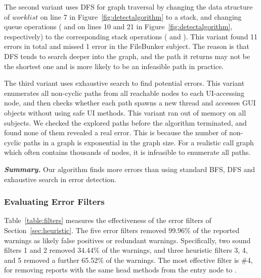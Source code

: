 The second variant uses DFS for graph traversal by changing
the data structure of $\mathit{worklist}$ on line 7 in Figure~\ref{fig:detectalgorithm} to
a stack, and changing queue operations ( and 
on lines 10 and 21 in Figure~\ref{fig:detectalgorithm}, respectively)
to the corresponding stack operations ( and ).
This variant found 11 errors in total and missed 1 error in the FileBunker subject.
The reason is that DFS tends to search deeper into the graph, and the path it returns
may not be the shortest one and is more likely to be an infeasible path in practice.


The third variant uses exhaustive search to find potential errors. This variant
enumerates all non-cyclic paths from all reachable  nodes
to each UI-accessing node, and then checks whether each
path spawns a new thread and accesses GUI objects without using safe UI methods.
This variant ran out of memory on all subjects. We checked
the explored paths before the algorithm terminated, and found none of them
revealed a real error. This is because the number of
non-cyclic paths in a graph is exponential in the graph size.
For a realistic call graph which often contains thousands of nodes,
it is infeasible to enumerate all paths.


\vspace{1mm}

\noindent \textbf{\textit{Summary.}} Our algorithm finds more errors than
using standard BFS, DFS and exhaustive search in error detection.


\subsubsection{Evaluating Error Filters}
\label{sec:filters}

Table~\ref{table:filters} measures the effectiveness of the
error filters of Section~\ref{sec:heuristic}.
The five error filters removed 99.96\% of the reported warnings as likely false positives
or redundant warnings. Specifically, two sound filters 1 and 2 
removed 34.44\% of the warnings, and three heuristic filters 3, 4, and 5
removed a further 65.52\% of the warnings. The most effective filter is
\#4, for removing reports with the same head methods from the entry node to .

